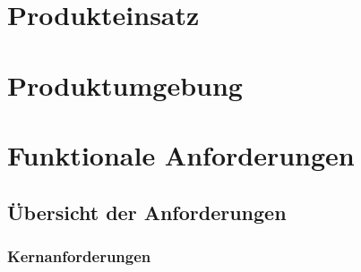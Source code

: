 \documentclass[a4paper,12pt]{article}
\begin{document}
\section{Produkteinsatz}

\section{Produktumgebung}

\section{Funktionale Anforderungen}

\subsection{Übersicht der Anforderungen}

\subsubsection{Kernanforderungen} %
\end{document}
